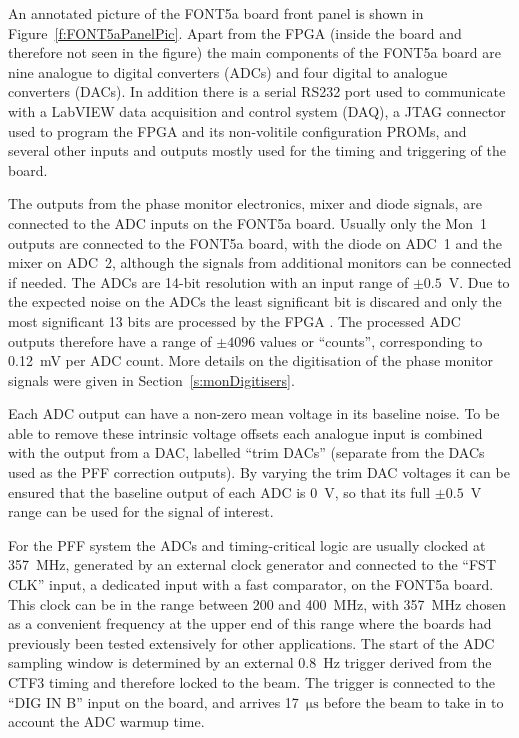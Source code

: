 An annotated picture of the FONT5a board front panel is shown in Figure~\ref{f:FONT5aPanelPic}. Apart from the FPGA (inside the board and therefore not seen in the figure) the main components of the FONT5a board are nine analogue to digital converters (ADCs) and four digital to analogue converters (DACs). In addition there is a serial RS232 port used to communicate with a LabVIEW data acquisition and control system (DAQ), a JTAG connector used to program the FPGA and its non-volitile configuration PROMs, and several other inputs and outputs mostly used for the timing and triggering of the board.

The outputs from the phase monitor electronics, mixer and diode signals, are connected to the ADC inputs on the FONT5a board. Usually only the Mon~1 outputs are connected to the FONT5a board, with the diode on ADC~1 and the mixer on ADC~2, although the signals from additional monitors can be connected if needed. The ADCs are 14-bit resolution with an input range of \(\pm0.5\)~V. Due to the expected noise on the ADCs the least significant bit is discared and only the most significant 13 bits are processed by the FPGA \cite{fontPaper}. The processed ADC outputs therefore have a range of \(\pm4096\) values or ``counts'', corresponding to 0.12~mV per ADC count. More details on the digitisation of the phase monitor signals were given in Section~\ref{s:monDigitisers}. 

Each ADC output can have a non-zero mean voltage in its baseline noise. To be able to remove these intrinsic voltage offsets each analogue input is combined with the output from a DAC, labelled ``trim DACs'' (separate from the DACs used as the PFF correction outputs). By varying the trim DAC voltages it can be ensured that the baseline output of each ADC is 0~V, so that its full \(\pm0.5\)~V range can be used for the signal of interest.

For the PFF system the ADCs and timing-critical logic are usually clocked at 357~MHz, generated by an external clock generator \cite{srsClockGen} and connected to the ``FST CLK'' input, a dedicated input with a fast comparator, on the FONT5a board. 
This clock can be in the range between 200 and 400~MHz, with 357~MHz chosen as a convenient frequency at the upper end of this range where the boards had previously been tested extensively for other applications.
The start of the ADC sampling window is determined by an external 0.8~Hz trigger derived from the CTF3 timing and therefore locked to the beam. The trigger is connected to the ``DIG IN B'' input on the board, and arrives 17~\(\mathrm{\mu s}\) before the beam to take in to account the ADC warmup time.


